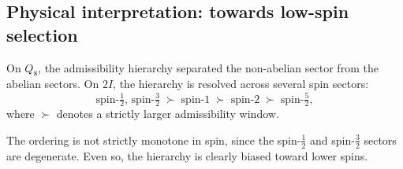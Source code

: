   \subsection{Physical interpretation: towards low-spin selection}
    \label{sec:step5-physics}

    On $Q_8$, the admissibility hierarchy separated the non-abelian sector from
    the abelian sectors.
    On $2I$, the hierarchy is resolved across several spin sectors:
    \begin{equation}
      \text{spin-}\tfrac{1}{2},\,\text{spin-}\tfrac{3}{2}
      \;\succ\;
      \text{spin-}1
      \;\succ\;
      \text{spin-}2
      \;\succ\;
      \text{spin-}\tfrac{5}{2},
      \label{eq:spin-ladder}
    \end{equation}
    where $\succ$ denotes a strictly larger admissibility window.

    The ordering is not strictly monotone in spin, since the
    spin-$\tfrac{1}{2}$ and spin-$\tfrac{3}{2}$ sectors are degenerate.
    Even so, the hierarchy is clearly biased toward lower spins.
